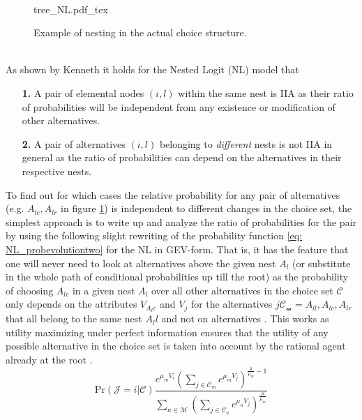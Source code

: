 \\
\begin{figure}[!h]
    \begin{center}
    \def\svgwidth{0.65\columnwidth}
    {tree_NL.pdf_tex}
    \end{center}
    \caption{Example of nesting in the actual choice structure.}
    \label{fig: tree_NL}
\end{figure}
\\
As shown by Kenneth \citet{train_discrete_2009} it holds for the Nested Logit (NL) model that
\begin{itemize}
  \item[\textbf{1.}] A pair of elemental nodes $(i,l)$ within the same nest is IIA as their ratio of probabilities will be independent from any existence or modification of other alternatives.
  \item[\textbf{2.}] A pair of alternatives $(i,l)$ belonging to \textit{different} nests is not IIA in general as the ratio of probabilities can depend on the alternatives in their respective nests.
\end{itemize}
To find out for which cases the relative probability for any pair of alternatives (e.g. $A_{lc},A_{lr}$ in figure \ref{fig: tree_NL}) is independent to different changes in the choice set, the simplest approach is to write up and analyze the ratio of probabilities for the pair by using the following slight rewriting of the probability function \eqref{eq: NL_probevolutiontwo} for the NL in GEV-form. That is, it has the feature that one will never need to look at alternatives above the given nest $A_{l}$ (or substitute in the whole path of conditional probabilities up till the root) as the probability of choosing $A_{lc}$ in a given nest $A_l$ over all other alternatives in the choice set $\mathcal{C}$ only depends on the attributes $V_{A_lc}$ and $V_j$ for the alternatives $j\mathcal{C_m}=A_{ll},A_{lc},A_{lr}$
that all belong to the same nest $A_ll$ and not on alternatives \citep{train_discrete_2009}. This works as utility maximizing under perfect information ensures that the utility of any possible alternative in the choice set is taken into account by the rational agent already at the root \citep{mcfadden_modelling_1977}.
\begin{equation} \label{eq: NL_probevolutionthree}
 \textrm{Pr}(\mathcal{J}=i|\mathcal{C})
 \frac{e^{\mu_mV_i}
   \left(\sum\limits_{j\in\mathcal{C}_m}e^{\mu_mV_j}
   \right)^{\frac{\mu}{\mu_m}-1}  }
 {\sum\limits_{n\in\mathcal{M}}
   \left(\sum\limits_{j\in\mathcal{C}_n}e^{\mu_nV_j}
   \right)^{\frac{\mu}{\mu_m}}  }
\end{equation}
